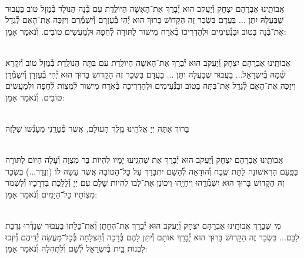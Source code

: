\documentclass[twoside, openany, parskip=half, 11pt]{book}
\begin{document}
\begin{sometimes}



\\
אֲבוֹתֵֽינוּ אַבְרָהָם יִצְחָק וְ֯יַעֲקֹב הוּא יְ֯בָרֵךְ אֶת־הָאִשָׁה הַיוֹלֶֽדֶת
עִם בְּ֯נָה הַנוֹלָד בְּ֯מַזָל טוֹב בַּעֲבוּר שֶׁבַּעֲלָהּ יִתֵּן ... בַּעֲדָם בִּשְׂכַר זֶה הַקָדוֹשׁ בָּרוּךְ הוּא יְ֯הִי בְּ֯עֶזְרָם וְ֯יִשְׁמְ֯רֵם וִיזַכֶּה אֶת־הָאֵם לְ֯גַדֵל אֶת־בְּ֯נָה בַּטוֹב וּבַנְּ֯֯עִימִים וּלְהַדְרִיכוֹ בְּ֯אֹֽרַח מִישׁוֹר לַתּוֹרָה לְ֯חֻפָּה וּלְמַעֲשִׂים טוֹבִים. וְ֯נֹאמַר אָמֵן:



\\
אֲבוֹתֵֽינוּ אַבְרָהָם יִצְחָק וְ֯יַעֲקֹב הוּא יְ֯בָרֵךְ אֶת־הָאִשָׁה הַיוֹלֶֽדֶת
עִם בִּתָּה הַנוֹלֶֽדֶת בְּ֯מַזָל טוֹב וְ֯יִקָרֵא שְׁ֯מָהּ בְּ֯יִשְׂרָאֵל... בַּעֲבוּר שֶׁבַּעֲלָהּ יִתֵּן ... בַּעֲדָם בִּשְׂכַר זֶה הַקָדוֹשׁ בָּרוּךְ הוּא יְ֯הִי בְּ֯עֶזְרָן וְ֯יִשְׁמְ֯רֵן וִיזַכֶּה אֶת־הָאֵם לְ֯גַדֵל אֶת־בִּתָּה בַּטוֹב ובַנְּ֯֯עִימִים וּלְהַדְרִיכָה בְּ֯אֹֽרַח מִישׁוֹר לְ֯מִצְוֹת לְ֯חֻפָּה וּלְמַעֲשִׂים טוֹבִים. וְ֯נֹאמַר אָמֵן:

\\
בָּרוּךְ אַתָּה יְיָ אֱלֹהֵֽינוּ מֶֽלֶךְ הָעוֹלָם, אֲשֶׁר פְּ֯טָרַֽנִי מֵעָנְ֯שׁוׂ שֶׁלָּזֶה

\\
אֲבוֹתֵֽינוּ אַבְרָהָם יִצְחָק וְ֯יַעֲקֹב הוּא יְ֯בָרֵךְ אֶת
שֶׁהִגִֽיעוּ יָמָיו לִהְיוֹת בַּר מִצְוָה וְ֯עָלָה הַיוֹם לַתּוֹרָה בַּפַּֽעַם הָרִאשׁוֹנָה לָתֵת שֶֽׁבַח וְ֯הוֹדָאָה לְ֯הַשֵׁם יִתְבָּרַךְ עַל כׇּל־הַטוֹבָה אֲשֶׁר עָשָׂה לוֹ (וְנָדַר...) בִּשְׂכַר זֶה הַקָדוֹשׁ בָּרוּךְ הוּא יִשְׁמְ֯רֵֽהוּ וִיחַיֵֽהוּ וִיכוֹנֵן אֶת־לִבּוֹ לִהְיוֹת שָׁלֵם עִם יְיָ וְ֯לָלֶֽכֶת בִּדְרָכָיו וְ֯לִשְׁמֹר מִצְוֹתָיו כׇּל־הַיָמִים וְ֯נֹאמַר אָמֵן:


\\
מִי שֶׁבֵּרַךְ אֲבוֹתֵֽינוּ אַבְרָהָם יִצְחָק וְ֯יַעֲקֹב הוּא יְ֯בָרֵךְ אֶת־הֶחָתָן  וְ֯אֶת־כַּלָתוֹ בַּעֲבוּר שֶׁנָדְ֯רוּ נִדְבַת לִבָּם... בִּשְׂכַר זֶה הַקָדוֹשׁ בָּרוּךְ הוּא יְ֯בָרֵךְ אוֹתָם וְ֯יִתֵּן לָהֶם בְּ֯רָכָה וְ֯הַצְלָחָה בְּ֯כׇל־מַעֲשֵׂה יְ֯דֵיהֶם וְ֯יִזְכוּ לִבְנוֹת בַּֽיִת בְּ֯יִשְׂרָאֵל לְ֯שֵׁם וְ֯לִתְהִלָה וְ֯נֹאמַר אָמֵן:


\end{sometimes}
\end{document}
